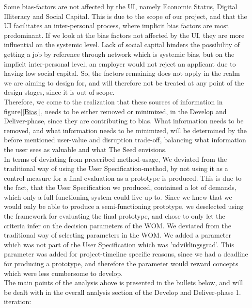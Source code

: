 Some bias-factors are not affected by the UI, namely Economic Status, Digital Illiteracy and Social Capital. This is due to the scope of our project, and that the UI facilitates an inter-personal process, where implicit bias factors are most predominant. If we look at the bias factors not affected by the UI, they are more influential on the systemic level. Lack of social capital hinders the possibility of getting a job by reference through network which is systemic bias, but on the implicit inter-personal level, an employer would not reject an applicant due to having low social capital. So, the factors remaining does not apply in the realm we are aiming to design for, and will therefore not be treated at any point of the design stages, since it is out of scope.\\

Therefore, we come to the realization that these sources of information in figure[\ref{Bias}], needs to be either removed or minimized, in the Develop and Deliver-phase, since they are contributing to bias. What information needs to be removed, and what information needs to be minimized, will be determined by the before mentioned user-value and disruption trade-off, balancing what information the user sees as valuable and what The Seed envisions.\\

In terms of deviating from prescribed method-usage, We deviated from the traditional way of using the User Specification-method, by not using it as a control measure for a final evaluation as a prototype is produced. This is due to the fact, that the User Specification we produced, contained a lot of demands, which only a full-functioning system could live up to. Since we knew that we would only be able to produce a semi-functioning prototype, we deselected using the framework for evaluating the final prototype, and chose to only let the criteria infer on the decision parameters of the WOM. 
We deviated from the traditional way of selecting parameters in the WOM. We added a parameter which was not part of the User Specification which was 'udviklingsgrad'. This parameter was added for project-timeline specific reasons, since we had a deadline for producing a prototype, and therefore the parameter would reward concepts which were less cumbersome to develop.\\

The main points of the analysis above is presented in the bullets below, and will be dealt with in the overall analysis section of the Develop and Deliver-phase 1. iteration:

